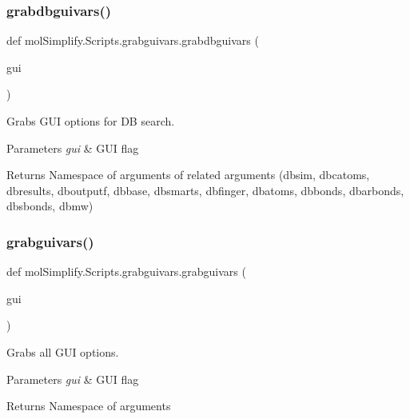 \subsubsection{\texorpdfstring{grabdbguivars()}{grabdbguivars()}}
{\footnotesize\ttfamily def mol\+Simplify.\+Scripts.\+grabguivars.\+grabdbguivars (\begin{DoxyParamCaption}\item[{}]{gui }\end{DoxyParamCaption})}



Grabs G\+UI options for DB search. 


\begin{DoxyParams}{Parameters}
{\em gui} & G\+UI flag \\
\hline
\end{DoxyParams}
\begin{DoxyReturn}{Returns}
Namespace of arguments of related arguments (dbsim, dbcatoms, dbresults, dboutputf, dbbase, dbsmarts, dbfinger, dbatoms, dbbonds, dbarbonds, dbsbonds, dbmw) 
\end{DoxyReturn}
\mbox{\label{namespacemolSimplify_1_1Scripts_1_1grabguivars_abec314e15ec84e9528e7efa942559cce}} 
\subsubsection{\texorpdfstring{grabguivars()}{grabguivars()}}
{\footnotesize\ttfamily def mol\+Simplify.\+Scripts.\+grabguivars.\+grabguivars (\begin{DoxyParamCaption}\item[{}]{gui }\end{DoxyParamCaption})}



Grabs all G\+UI options. 


\begin{DoxyParams}{Parameters}
{\em gui} & G\+UI flag \\
\hline
\end{DoxyParams}
\begin{DoxyReturn}{Returns}
Namespace of arguments 
\end{DoxyReturn}
\mbox{\label{namespacemolSimplify_1_1Scripts_1_1grabguivars_ab489c45fcb00c2a8e9bbad48ab210770}} 
